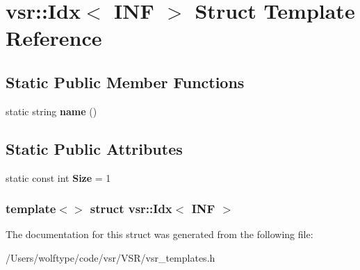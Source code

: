 \hypertarget{structvsr_1_1_idx_3_01_i_n_f_01_4}{\section{vsr\-:\-:Idx$<$ I\-N\-F $>$ Struct Template Reference}
\label{structvsr_1_1_idx_3_01_i_n_f_01_4}
}
\subsection*{Static Public Member Functions}
\begin{DoxyCompactItemize}
\item 
\hypertarget{structvsr_1_1_idx_3_01_i_n_f_01_4_a2cb0e7ecfdf88df1442ccb4cde011a70}{static string {\bfseries name} ()}\label{structvsr_1_1_idx_3_01_i_n_f_01_4_a2cb0e7ecfdf88df1442ccb4cde011a70}

\end{DoxyCompactItemize}
\subsection*{Static Public Attributes}
\begin{DoxyCompactItemize}
\item 
\hypertarget{structvsr_1_1_idx_3_01_i_n_f_01_4_ab385cafd15cadf9af49e75a6809969eb}{static const int {\bfseries Size} = 1}\label{structvsr_1_1_idx_3_01_i_n_f_01_4_ab385cafd15cadf9af49e75a6809969eb}

\end{DoxyCompactItemize}
\subsubsection*{template$<$$>$ struct vsr\-::\-Idx$<$ I\-N\-F $>$}



The documentation for this struct was generated from the following file\-:\begin{DoxyCompactItemize}
\item 
/\-Users/wolftype/code/vsr/\-V\-S\-R/vsr\-\_\-templates.\-h\end{DoxyCompactItemize}
